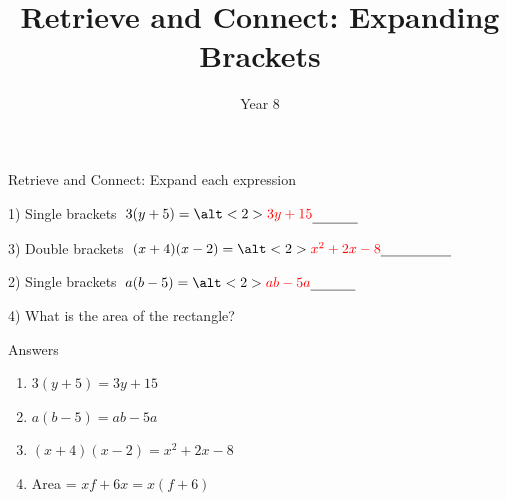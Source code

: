 \documentclass{beamer}
\title{Retrieve and Connect: Expanding Brackets}
\author{Year 8}
\date{}
\newcommand{\ablank}[1]{%
  \alt<2>{\textcolor{red}{#1}}{\underline{\phantom{#1}}}%
}
\newcommand{\ashow}[1]{\uncover<2->{\textcolor{red}{\small #1}}}
\newcommand{\ashowq}[1]{\alt<2->{\textcolor{red}{\small #1}}{?}}
\begin{document}
\begin{frame}
  \titlepage
\end{frame}

\begin{frame}{Retrieve and Connect: Expand each expression}
\begin{minipage}[t]{0.48\textwidth}
  \begin{block}{1) Single brackets}
    \Large \(\;3(y+5)=\ablank{3y+15}\)
  \end{block}
  \vspace{0.5em}
  \begin{block}{3) Double brackets}
    \Large \(\;(x+4)(x-2)=\ablank{x^2+2x-8}\)
  \end{block}
\end{minipage}\hfill
\begin{minipage}[t]{0.48\textwidth}
  \begin{block}{2) Single brackets}
    \Large \(\; a(b-5)=\ablank{ab-5a}\)
  \end{block}
  \vspace{0.5em}
  \begin{block}{4) What is the area of the rectangle?}
    \par\vspace{0.5em}
    \ashow{Area = \(x(f+6)\)}
  \end{block}
\end{minipage}
\end{frame}

\begin{frame}{Answers}
\begin{enumerate}
  \item \(3(y+5)=3y+15\)
  \item \(a(b-5)=ab-5a\)
  \item \((x+4)(x-2)=x^2+2x-8\)
  \item Area = \(xf + 6x = x(f+6)\)
\end{enumerate}
\end{frame}
\end{document}
